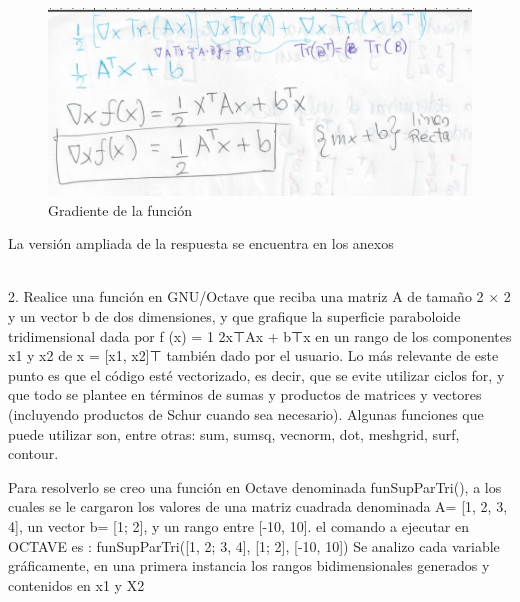 \documentclass[12pt,letterpaper]{article}
\begin{document}
 \begin{figure}[H]
    \centering
    \includegraphics[scale=0.55]{A&A_GAF_HW01/fig/A&A_HW01_08.png}
    \caption{Gradiente de la función \cite{Mariano}   }
    \label{fig:MV4}
\end{figure}

La versión ampliada de la respuesta se encuentra en los anexos

\\
2. Realice una función en GNU/Octave que reciba una matriz A de tamaño 2 × 2 y un vector
b de dos dimensiones, y que grafique la superficie paraboloide tridimensional dada por
f (x) = 1
2x⊤Ax + b⊤x
en un rango de los componentes x1 y x2 de x = [x1, x2]⊤ también dado por el usuario.
Lo más relevante de este punto es que el código esté vectorizado, es decir, que se evite utilizar
ciclos for, y que todo se plantee en términos de sumas y productos de matrices y vectores
(incluyendo productos de Schur cuando sea necesario).
Algunas funciones que puede utilizar son, entre otras: sum, sumsq, vecnorm, dot, meshgrid,
surf, contour.

Para resolverlo se creo una función en Octave denominada funSupParTri(), a los cuales se le cargaron los valores de una matriz cuadrada denominada A= [1, 2, 3, 4], un vector b= [1; 2], y un rango entre [-10, 10]. el comando a ejecutar en OCTAVE es : funSupParTri([1, 2; 3, 4], [1; 2], [-10, 10])
Se analizo cada variable gráficamente, en una primera instancia los rangos bidimensionales generados y contenidos en x1 y X2
\end{document}
